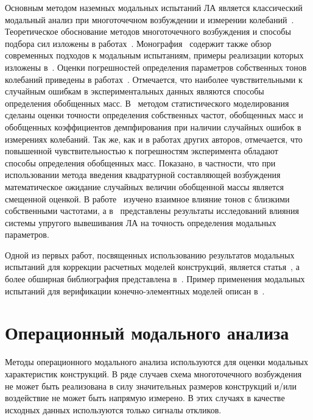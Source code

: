 Основным методом наземных модальных испытаний ЛА является классический модальный анализ при многоточечном возбуждении и измерении колебаний~\cite{lib:ema:Karklje:GVT}. Теоретическое обоснование методов многоточечного возбуждения и способы подбора сил изложены в работах~\cite{lib:ema:Dat, lib:ema:Dat&Tretout&Lafont, lib:ema:Mikishev, lib:ema:Smyslov, lib:ema:Heilen, lib:ema:Berns:identification}. Монография~\cite{lib:ema:Heilen} содержит также обзор современных подходов к модальным испытаниям, примеры реализации которых изложены в~\cite{lib:ema:Boswald, lib:ema:Brillhart, lib:ema:Peres, lib:ema:Peter, lib:ema:Pickrel}. Оценки погрешностей определения параметров собственных тонов колебаний приведены в работах~\cite{lib:ema:Smyslov, lib:ema:Vasiliev, lib:ema:Zharov, lib:ema:Ushkalov}. Отмечается, что наиболее чувствительными к случайным ошибкам в экспериментальных данных являются способы определения обобщенных масс. В~\cite{lib:ema:Berns:estimate} методом статистического моделирования сделаны оценки точности определения собственных частот, обобщенных масс и обобщенных коэффициентов демпфирования при наличии случайных ошибок в измерениях колебаний. Так же, как и в работах других авторов, отмечается, что повышенной чувствительностью к погрешностям эксперимента обладают способы определения обобщенных масс. Показано, в частности, что при использовании метода введения квадратурной составляющей возбуждения математическое ожидание случайных величин обобщенной массы является смещенной оценкой. В работе~\cite{lib:ema:Berns:errors} изучено взаимное влияние тонов с близкими собственными частотами, а в~\cite{lib:ema:Berns:support} представлены результаты исследований влияния системы упругого вывешивания ЛА на точность определения модальных параметров. 

Одной из первых работ, посвященных использованию результатов модальных испытаний для коррекции расчетных моделей конструкций, является статья~\cite{lib:ema:Baruch}, а более обширная библиография представлена в~\cite{lib:ema:Heilen}. Пример применения модальных испытаний для верификации конечно-элементных моделей описан в~\cite{lib:ema:Mezhin}.

\section{Операционный модального анализа}

Методы операционного модального анализа используются для оценки модальных характеристик конструкций. В ряде случаев схема многоточечного возбуждения не может быть реализована в силу значительных размеров конструкций и/или воздействие не может быть напрямую измерено. В этих случаях в качестве исходных данных используются только сигналы откликов. 

